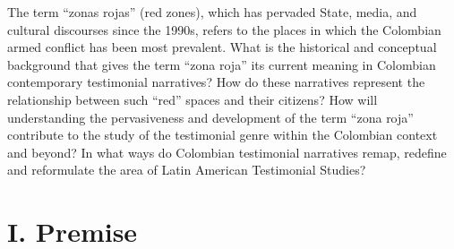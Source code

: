 \documentclass[
  11pt,
,
onecolumn,
openany
]{book}
\begin{document}
The term ``zonas rojas'' (red zones), which has pervaded State, media, and
cultural discourses since the 1990s, refers to the places in which the
Colombian armed conflict has been most prevalent. What is the historical and
conceptual background that gives the term ``zona roja'' its current meaning in
Colombian contemporary testimonial narratives? How do these narratives
represent the relationship between such ``red'' spaces and their citizens? How
will understanding the pervasiveness and development of the term ``zona roja''
contribute to the study of the testimonial genre within the Colombian context
and beyond? In what ways do Colombian testimonial narratives remap, redefine
and reformulate the area of Latin American Testimonial Studies?

\hypertarget{i.-premise}{%
\chapter{I. Premise}\label{i.-premise}}
\end{document}
